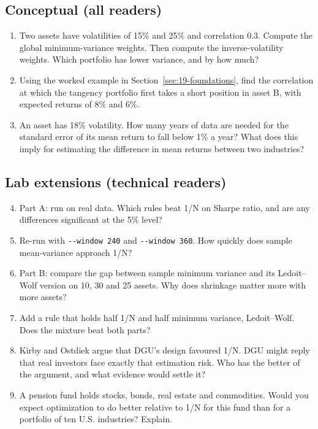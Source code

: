 \subsection*{Conceptual (all readers)}

\begin{enumerate}
  \item Two assets have volatilities of 15\% and 25\% and correlation 0.3. Compute the global minimum-variance weights. Then compute the inverse-volatility weights. Which portfolio has lower variance, and by how much?
  \item Using the worked example in Section~\ref{sec:19-foundations}, find the correlation at which the tangency portfolio first takes a short position in asset B, with expected returns of 8\% and 6\%.
  \item An asset has 18\% volatility. How many years of data are needed for the standard error of its mean return to fall below 1\% a year? What does this imply for estimating the difference in mean returns between two industries?
\end{enumerate}

\subsection*{Lab extensions (technical readers)}

\begin{enumerate}
  \setcounter{enumi}{3}
  \item Part A: run on real data. Which rules beat 1/N on Sharpe ratio, and are any differences significant at the 5\% level?
  \item Re-run with \texttt{-{}-window 240} and \texttt{-{}-window 360}. How quickly does sample mean-variance approach 1/N?
  \item Part B: compare the gap between sample minimum variance and its Ledoit--Wolf version on 10, 30 and 25 assets. Why does shrinkage matter more with more assets?
  \item Add a rule that holds half 1/N and half minimum variance, Ledoit--Wolf. Does the mixture beat both parts?
  \item Kirby and Ostdiek argue that DGU's design favoured 1/N. DGU might reply that real investors face exactly that estimation risk. Who has the better of the argument, and what evidence would settle it?
  \item A pension fund holds stocks, bonds, real estate and commodities. Would you expect optimization to do better relative to 1/N for this fund than for a portfolio of ten U.S. industries? Explain.
\end{enumerate}
